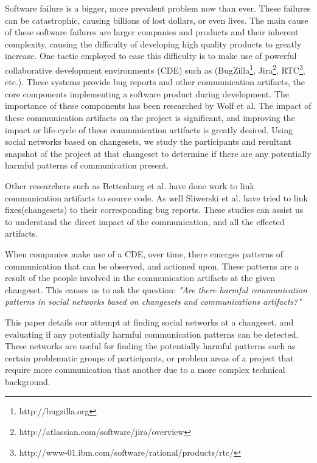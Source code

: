 \documentclass[conference]{IEEEtran}
\begin{document}
Software failure is a bigger, more prevalent problem now than ever.  These failures can be catastrophic, causing billions of lost dollars, or even lives.  The main cause of these software failures are larger companies and products and their inherent complexity, causing the difficulty of developing high quality products to greatly increase.  One tactic employed to ease this difficulty is to make use of powerful collaborative development environments (CDE) such as (BugZilla\footnote{http://bugzilla.org}, Jira\footnote{http://atlassian.com/software/jira/overview}, RTC\footnote{http://www-01.ibm.com/software/rational/products/rtc/}, etc.).  These systems provide bug reports and other communication artifacts, the core components implementing a software product during development.  The importance of these components has been researched by Wolf et al\cite{4721184}.  The impact of these communication artifacts on the project is significant, and improving the impact or life-cycle of these communication artifacts is greatly desired.  Using social networks based on changesets, we study the participants and resultant snapshot of the project at that changeset to determine if there are any potentially harmful patterns of communication present.  

Other researchers such as Bettenburg et al. have done work to link communication artifacts to source code\cite{Bettenburg:2008:ESI:1370750.1370757}.  As well Sliwerski et al. have tried to link fixes(changesets) to their corresponding bug reports\cite{Sliwerski:2005:CIF:1083142.1083147}.  These studies can assist us to understand the direct impact of the communication, and all the effected artifacts.  

When companies make use of a CDE, over time, there emerges patterns of communication that can be observed, and actioned upon.  These patterns are a result of the people involved in the communication artifacts at the given changeset.   This causes us to ask the question: \textit{"Are there harmful communication patterns in social networks based on changesets and communications artifacts?"}  

This paper details our attempt at finding social networks at a changeset, and evaluating if any potentially harmful communication patterns can be detected.  These networks are useful for finding the potentially harmful patterns such as certain problematic groups of participants, or problem areas of a project that require more communication that another due to a more complex technical background. 
\end{document}
